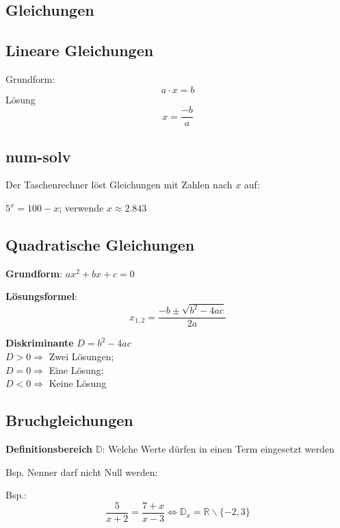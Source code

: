 \begin{multicols}{2}
\hrulefill
\section*{Gleichungen}

\subsection*{Lineare Gleichungen}

Grundform:
$$a\cdot{}x = b$$
Lösung 
$$x = \frac{-b}{a}$$

\subsection*{num-solv}
Der Taschenrechner löst Gleichungen mit Zahlen nach $x$ auf:

$5^x = 100 -x$; verwende  $x\approx{}2.843$

\forceCB
\subsection*{Quadratische Gleichungen}

\textbf{Grundform}: $ax^2 + bx+c = 0$

\textbf{Lösungsformel}:
$$x_{1,2} = \frac{-b \pm \sqrt{b^2-4ac}}{2a}$$

\textbf{Diskriminante} $D = b^2-4ac$\\
$D>0\Longrightarrow$ Zwei Lösungen;\\
$D=0\Longrightarrow$ Eine Lösung;\\
$D<0\Longrightarrow$ Keine Lösung

\hrulefill



\subsection*{Bruchgleichungen}

\begin{definition*}{}{}

\textbf{Definitionsbereich} $\mathbb{D}$: Welche Werte dürfen in einen Term eingesetzt werden

Bsp. Nenner darf nicht Null werden:

Bsp.: $$\frac5{x+2}=\frac{7+x}{x-3} \Leftrightarrow{} \mathbb{D}_x=\mathbb{R}\backslash{}\{-2, 3\}$$
\end{definition*}



\end{multicols}
